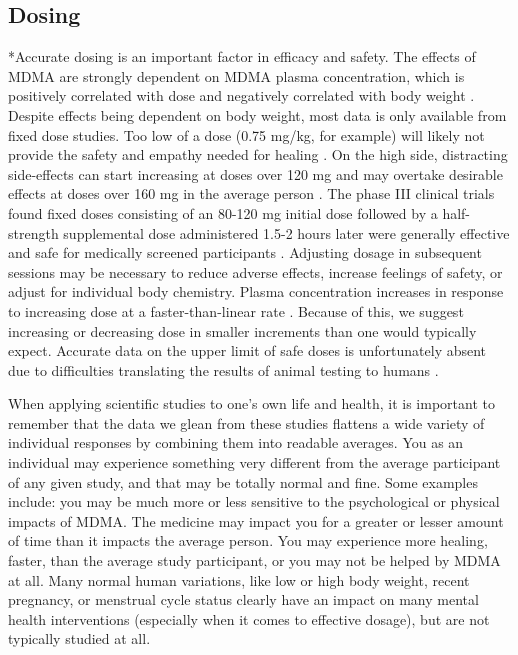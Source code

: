 \documentclass[12pt,letterpaper]{article}
\begin{document}
\subsection{Dosing}
\label{sec:dosing}
*Accurate dosing is an important factor in efficacy and safety. The effects of MDMA are strongly dependent on MDMA plasma concentration, which is positively correlated with dose and negatively correlated with body weight \cite{studerusResponse}. Despite effects being dependent on body weight, most data is only available from fixed dose studies. Too low of a dose (0.75 mg/kg, for example) will likely not provide the safety and empathy needed for healing \cite{bediMDMALowDose}. On the high side, distracting side-effects can start increasing at doses over 120 mg and may overtake desirable effects at doses over 160 mg in the average person \cite{bruntLinking}. The phase III clinical trials found fixed doses consisting of an 80-120 mg initial dose followed by a half-strength supplemental dose administered 1.5-2 hours later were generally effective and safe for medically screened participants \cite{mitchellMDMAClinicalTrial2}. Adjusting dosage in subsequent sessions may be necessary to reduce adverse effects, increase feelings of safety, or adjust for individual body chemistry. Plasma concentration increases in response to increasing dose at a faster-than-linear rate \cite{de2000nonlinear}. Because of this, we suggest increasing or decreasing dose in smaller increments than one would typically expect. Accurate data on the upper limit of safe doses is unfortunately absent due to difficulties translating the results of animal testing to humans \cite{passieHistory}.

When applying scientific studies to one's own life and health, it is important to remember that the data we glean from these studies flattens a wide variety of individual responses by combining them into readable averages. You as an individual may experience something very different from the average participant of any given study, and that may be totally normal and fine. Some examples include: you may be much more or less sensitive to the psychological or physical impacts of MDMA. The medicine may impact you for a greater or lesser amount of time than it impacts the average person. You may experience more healing, faster, than the average study participant, or you may not be helped by MDMA at all.  Many normal human variations, like low or high body weight, recent pregnancy, or menstrual cycle status clearly have an impact on many mental health interventions (especially when it comes to effective dosage), but are not typically studied at all.
\end{document}
